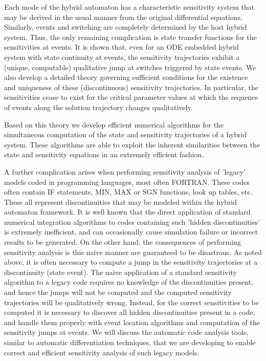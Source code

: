 \documentclass[11pt]{article}
\begin{document}
Each mode of the hybrid automaton has a characteristic sensitivity system that may be derived in the usual manner from the original differential equations. Similarly, events and switching are completely determined by the host hybrid system. Thus, the only remaining complication is state transfer functions for the sensitivities at events. It is shown that, even for an ODE embedded hybrid system with state continuity at events, the sensitivity trajectories exhibit a (unique, computable) qualitative jump at switches triggered by state events. We also develop a detailed theory governing sufficient conditions for the existence and uniqueness of these (discontinuous) sensitivity trajectories. In particular, the sensitivities cease to exist for the critical parameter values at which the sequence of events along the solution trajectory changes qualitatively.



Based on this theory we develop efficient numerical algorithms for the simultaneous
computation of the state and sensitivity trajectories of a hybrid system. These algorithms are able to exploit the inherent similarities between the state and sensitivity equations in an
extremely efficient fashion. 



A further complication arises when performing sensitivity analysis of 'legacy' models coded in programming languages, most often FORTRAN. These codes often contain IF statements, MIN, MAX or SGN functions, look up tables, etc. These all represent discontinuities that may be modeled within the hybrid automaton framework. It is well known that the direct application of standard numerical integration algorithms to codes containing such 'hidden discontinuities' is extremely inefficient, and can occasionally cause simulation failure or incorrect results to be generated. On the other hand, the consequences of performing sensitivity analysis is this naive manner are guaranteed to be disastrous. As noted above, it is often necessary to compute a jump in the sensitivity trajectories at a discontinuity (state event). The naive application of a standard sensitivity algorithm to a legacy code requires no knowledge of the discontinuities present, and hence the jumps will not be computed and the computed sensitivity trajectories will be qualitatively wrong. Instead, for the correct sensitivities to be computed it is necessary to discover all hidden discontinuities present in a code, and handle them properly with event location algorithms and computation of the sensitivity jumps at events. We will discuss the automatic code analysis tools, similar to automatic differentiation techniques, that we are developing to enable correct and efficient sensitivity analysis of such legacy models.  
\end{document}

